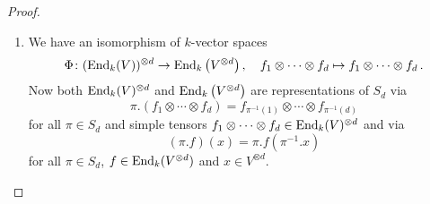 \begin{proof}
  \leavevmode
  \begin{enumerate}
    \item
      We have an isomorphism of $k$-vector spaces
      \begin{align*}
                \Phi
        \colon  (\operatorname{End}_k(V))^{\otimes d}
        \to     \operatorname{End}_k\left( V^{\otimes d} \right),
        \quad   f_1 \otimes \dotsb \otimes f_d
        \mapsto f_1 \otimes \dotsb \otimes f_d \,.
      \end{align*}
      Now both $\operatorname{End}_k(V)^{\otimes d}$ and $\operatorname{End}_k\left( V^{\otimes d} \right)$ are representations of $S_d$ via
      \[
          \pi.(f_1 \otimes \dotsb \otimes f_d)
        = f_{\pi^{-1}(1)} \otimes \dotsb \otimes f_{\pi^{-1}(d)}
      \]
      for all $\pi \in S_d$ and simple tensors $f_1 \otimes \dotsb \otimes f_d \in \operatorname{End}_k(V)^{\otimes d}$ and via
      \[
          (\pi.f)(x)
        = \pi.f\left( \pi^{-1}.x \right)
      \]
      for all $\pi \in S_d$, $f \in \operatorname{End}_k(V^{\otimes d})$ and $x \in V^{\otimes d}$.
      

\end{enumerate}
\end{proof}
